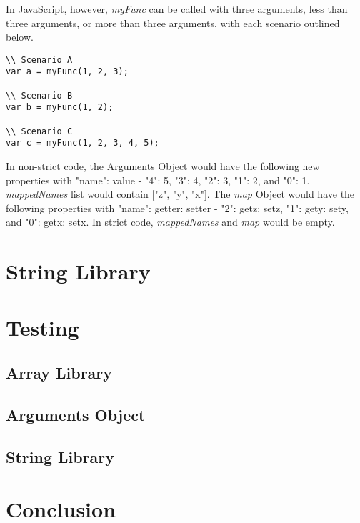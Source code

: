 \documentclass[a4paper,11pt,twoside]{report}
\begin{document}
In JavaScript, however, \textit{myFunc} can be called with three arguments, less than three arguments, or more than three arguments, with each scenario outlined below.
\begin{adjustwidth}{2cm}{2cm}
\begin{lstlisting}
\\ Scenario A
var a = myFunc(1, 2, 3);

\\ Scenario B
var b = myFunc(1, 2);

\\ Scenario C
var c = myFunc(1, 2, 3, 4, 5);
\end{lstlisting}
\end{adjustwidth}
In non-strict code, the Arguments Object would have the following new properties with "name": value - "4": 5, "3": 4, "2": 3, "1": 2, and "0": 1. \textit{mappedNames} list would contain ["z", "y", "x"]. The \textit{map} Object would have the following properties with "name": getter: setter - "2": getz: setz, "1": gety: sety, and "0": getx: setx. In strict code, \textit{mappedNames} and \textit{map} would be empty.

\chapter{String Library}

\chapter{Testing}
\section{Array Library}

\section{Arguments Object}

\section{String Library}

\chapter{Conclusion}




\end{document}
